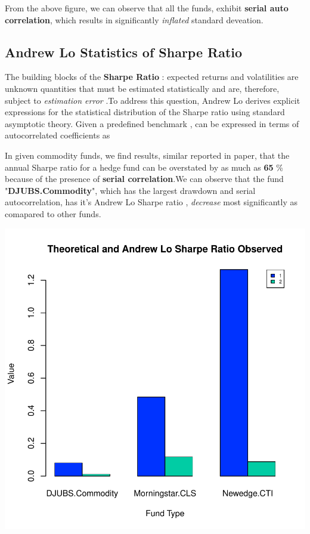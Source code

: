 \documentclass[12pt,letterpaper,english]{article}
\begin{document}
From the above figure, we can observe that all the funds, exhibit \textbf{serial auto correlation}, which results in significantly \emph{inflated} standard deveation.
\subsection{Andrew Lo Statistics of Sharpe Ratio}

The building blocks of the \textbf{Sharpe Ratio} : expected returns and volatilities  are unknown quantities that must be estimated statistically and are,
therefore, subject to \emph{estimation error} .To address this question, Andrew Lo derives explicit expressions for the statistical distribution of the Sharpe ratio using
standard asymptotic theory. 
Given a predefined benchmark ,  can be expressed in terms of autocorrelated coefficients as
 
 
In given commodity funds, we find results, similar reported in paper, that the annual Sharpe ratio for a hedge fund can be overstated by as much as \textbf{65} \% because of the presence of \textbf{serial correlation}.We can observe that the fund "\textbf{DJUBS.Commodity}", which has the largest drawdown and serial autocorrelation, has it's Andrew Lo Sharpe ratio , \emph{decrease} most significantly as comapared to other funds.

\includegraphics{CommodityReport-006}
\end{document}
